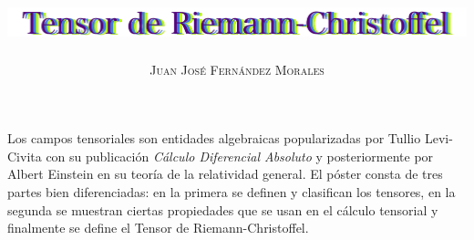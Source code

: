 \documentclass[a0,portrait]{a0poster} %
\title{\includegraphics[scale=0.5]{Media/Titulo.png}} %
\author{\textsc{\huge Juan José Fernández Morales}} %
\date{} %
\begin{document}
\pagestyle{empty} %
\maketitle %
\thispagestyle{empty} %


\begin{center}{\fontsize{36}{40} \selectfont
    Los campos tensoriales son entidades algebraicas popularizadas por Tullio Levi-Civita con su publicación \textit{Cálculo Diferencial Absoluto} y posteriormente por Albert Einstein en su teoría de la relatividad general. El póster consta de tres partes bien diferenciadas: en la primera se definen y clasifican los tensores, en la segunda se muestran ciertas propiedades que se usan en el cálculo tensorial y finalmente se define el Tensor de Riemann-Christoffel.
    }
\end{center} 
\vspace{20pt} %

\end{document}
